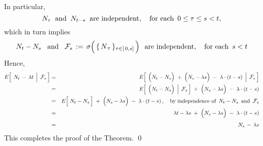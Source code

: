 In particular,
\begin{equation*}
N_{\tau} \;\;\textnormal{and}\;\; N_{t-s}\;\;\textnormal{are independent},
\quad\textnormal{for each \,$0 \leq \tau \leq s < t$},
\end{equation*}
which in turn implies
\begin{equation*}
N_{t} - N_{s}
\;\;\;\textnormal{and}\;\;\;
\mathcal{F}_{s} \,:=\, \sigma\!\left(\,\{\,\overset{{\color{white}.}}{N}_{\tau}\,\}_{\tau\in[\,0,s]}\,\right)
\;\;\textnormal{are independent},
\quad\textnormal{for each \,$s < t$}
\end{equation*}
Hence,
\begin{eqnarray*}
E\!\left[\;\left. N_{t}\,\overset{{\color{white}.}}{-}\,\lambda t\;\,\right\vert\;\mathcal{F}_{s}\,\right]
& = &
	E\!\left[\;\left.
		\left(N_{t} \overset{{\color{white}.}}{-} N_{s}\right)
		\;+\;
		\left(N_{s} \overset{{\color{white}.}}{-} \lambda s\right)
		\;-\;
		\lambda\cdot(t - s)
	\;\,\right\vert\;
		\mathcal{F}_{s}
		\,\right]
\\
& = &
	E\!\left[\;\left.
		\left(N_{t} \overset{{\color{white}.}}{-} N_{s}\right)
	\;\,\right\vert\;
		\mathcal{F}_{s}
		\,\right]
	\;+\;
	\left(N_{s} \overset{{\color{white}.}}{-} \lambda s\right)
	\;-\;
	\lambda\cdot(t - s)
\\
& = &
	E\!\left[\; N_{t} \overset{{\color{white}.}}{-} N_{s} \,\right]
	\;+\;
	\left(N_{s} \overset{{\color{white}.}}{-} \lambda s\right)
	\;-\;
	\lambda\cdot(t - s)\,,
	\quad
	\textnormal{by independence of \,$N_{t} - N_{s}$\, and \,$\mathcal{F}_{s}$}
\\
& = &
	\lambda t - \lambda s
	\;+\;
	\left(N_{s} \overset{{\color{white}.}}{-} \lambda s\right)
	\;-\;
	\lambda\cdot(t - s)
\\
& \overset{{\color{white}1}}{=} &
	N_{s} \, - \, \lambda s
\end{eqnarray*}
This completes the proof of the Theorem.
\qed


\renewcommand{\theenumi}{\roman{enumi}}
\renewcommand{\labelenumi}{\textnormal{(\theenumi)}$\;\;$}

